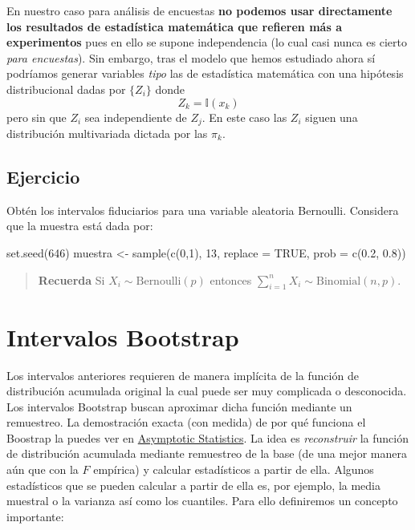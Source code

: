 \documentclass[
]{book}
\newenvironment{Shaded}{\begin{snugshade}}{\end{snugshade}}
\newcommand{\AttributeTok}[1]{\textcolor[rgb]{0.77,0.63,0.00}{#1}}
\newcommand{\ConstantTok}[1]{\textcolor[rgb]{0.00,0.00,0.00}{#1}}
\newcommand{\DecValTok}[1]{\textcolor[rgb]{0.00,0.00,0.81}{#1}}
\newcommand{\FloatTok}[1]{\textcolor[rgb]{0.00,0.00,0.81}{#1}}
\newcommand{\FunctionTok}[1]{\textcolor[rgb]{0.00,0.00,0.00}{#1}}
\newcommand{\NormalTok}[1]{#1}
\newcommand{\OtherTok}[1]{\textcolor[rgb]{0.56,0.35,0.01}{#1}}
\begin{document}
En nuestro caso para análisis de encuestas \textbf{no podemos usar directamente los resultados de estadística matemática que refieren más a experimentos} pues en ello se supone independencia (lo cual casi nunca es cierto \emph{para encuestas}). Sin embargo, tras el modelo que hemos estudiado ahora sí podríamos generar variables \emph{tipo} las de estadística matemática con una hipótesis distribucional dadas por \(\{Z_i\}\) donde
\[
Z_k = \mathbb{I}(x_k)
\]
pero sin que \(Z_i\) sea independiente de \(Z_j\). En este caso las \(Z_i\) siguen una distribución multivariada dictada por las \(\pi_k\).

\hypertarget{ejercicio-9}{%
\subsection{Ejercicio}\label{ejercicio-9}}

Obtén los intervalos fiduciarios para una variable aleatoria Bernoulli. Considera que la muestra está dada por:

\begin{Shaded}
\begin{Highlighting}[]
\FunctionTok{set.seed}\NormalTok{(}\DecValTok{646}\NormalTok{)}
\NormalTok{muestra }\OtherTok{\textless{}{-}} \FunctionTok{sample}\NormalTok{(}\FunctionTok{c}\NormalTok{(}\DecValTok{0}\NormalTok{,}\DecValTok{1}\NormalTok{), }\DecValTok{13}\NormalTok{, }\AttributeTok{replace =} \ConstantTok{TRUE}\NormalTok{, }\AttributeTok{prob =} \FunctionTok{c}\NormalTok{(}\FloatTok{0.2}\NormalTok{, }\FloatTok{0.8}\NormalTok{))}
\end{Highlighting}
\end{Shaded}

\begin{quote}
\textbf{Recuerda} Si \(X_i \sim \textrm{Bernoulli}(p)\) entonces \(\sum_{i = 1}^n X_i \sim \textrm{Binomial}(n,p)\).
\end{quote}

\hypertarget{intervalos-bootstrap}{%
\section{Intervalos Bootstrap}\label{intervalos-bootstrap}}

Los intervalos anteriores requieren de manera implícita de la función de distribución acumulada original la cual puede ser muy complicada o desconocida. Los intervalos Bootstrap buscan aproximar dicha función mediante un remuestreo. La demostración exacta (con medida) de por qué funciona el Boostrap la puedes ver en \href{https://www.cambridge.org/core/books/asymptotic-statistics/A3C7DAD3F7E66A1FA60E9C8FE132EE1D}{Asymptotic Statistics}. La idea es \emph{reconstruir} la función de distribución acumulada mediante remuestreo de la base (de una mejor manera aún que con la \(\hat{F}\) empírica) y calcular estadísticos a partir de ella. Algunos estadísticos que se pueden calcular a partir de ella es, por ejemplo, la media muestral o la varianza así como los cuantiles. Para ello definiremos un concepto importante:
\end{document}
